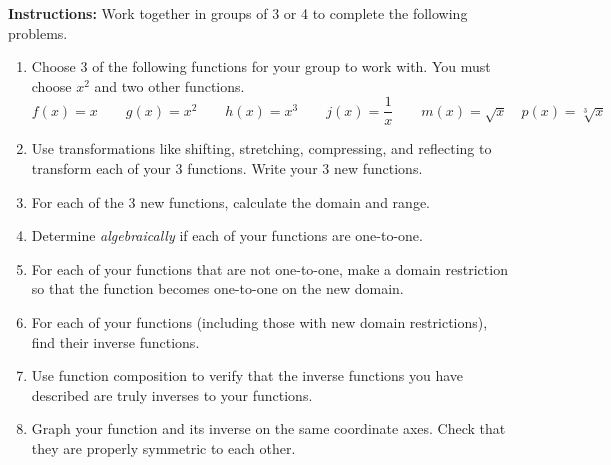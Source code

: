 

\noindent \textbf{Instructions:}  Work together in groups of  3 or 4 to complete the following problems.




\begin{enumerate}
\item Choose 3 of the following functions for your group to work with.  You must choose $x^2$ and two other functions.
$$f(x)=x \quad \quad g(x)=x^2 \quad \quad h(x)=x^3 \quad \quad j(x)=\frac{1}{x} \quad \quad m(x)=\sqrt{x}  \quad p(x)=\sqrt[3]{x}$$

\item Use transformations like shifting, stretching, compressing, and reflecting to transform each of your 3 functions.  Write your 3 new functions.

\vfill

\item  For each of the 3 new functions, calculate the domain and range.

\vfill

\newpage


\item Determine \emph{algebraically} if each of your functions are one-to-one.  

\vfill
\vfill


\item For each of your functions that are not one-to-one, make a domain restriction so that the function becomes one-to-one on the new domain.

\vfill

\newpage


\item For each of your functions (including those with new domain restrictions), find their inverse functions.

\vfill

\item Use function composition to verify that the inverse functions you have described are truly inverses to your functions.

\vfill

\newpage

\item Graph your function and its inverse on the same coordinate axes.  Check that they are properly symmetric to each other.

\begin{multicols}{2}


\end{multicols}
\end{enumerate}
